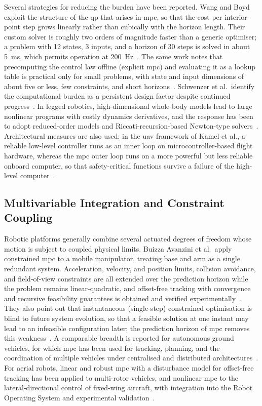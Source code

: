 Several strategies for reducing the burden have been reported. Wang and Boyd exploit the structure of the \ac{qp} that arises in \ac{mpc}, so that the cost per interior-point step grows linearly rather than cubically with the horizon length. Their custom solver is roughly two orders of magnitude faster than a generic optimiser; a problem with 12 states, 3 inputs, and a horizon of 30 steps is solved in about 5~ms, which permits operation at 200~Hz~\cite{wang2010}. The same work notes that precomputing the control law offline (explicit \ac{mpc}) and evaluating it as a lookup table is practical only for small problems, with state and input dimensions of about five or less, few constraints, and short horizons~\cite{wang2010,schwenzer2021}. Schwenzer et al.\ identify the computational burden as a persistent design factor despite continued progress~\cite{schwenzer2021}. In legged robotics, high-dimensional whole-body models lead to large nonlinear programs with costly dynamics derivatives, and the response has been to adopt reduced-order models and Riccati-recursion-based Newton-type solvers~\cite{katayama2023}. Architectural measures are also used: in the \ac{uav} framework of Kamel et al., a reliable low-level controller runs as an inner loop on microcontroller-based flight hardware, whereas the \ac{mpc} outer loop runs on a more powerful but less reliable onboard computer, so that safety-critical functions survive a failure of the high-level computer~\cite{kamel2017}.

\subsection{Multivariable Integration and Constraint Coupling}\label{sec:bg-apps-multivariable}

Robotic platforms generally combine several actuated degrees of freedom whose motion is subject to coupled physical limits. Buizza Avanzini et al.\ apply constrained \ac{mpc} to a mobile manipulator, treating base and arm as a single redundant system. Acceleration, velocity, and position limits, collision avoidance, and field-of-view constraints are all extended over the prediction horizon while the problem remains linear-quadratic, and offset-free tracking with convergence and recursive feasibility guarantees is obtained and verified experimentally~\cite{buizza2018}. They also point out that instantaneous (single-step) constrained optimisation is blind to future system evolution, so that a feasible solution at one instant may lead to an infeasible configuration later; the prediction horizon of \ac{mpc} removes this weakness~\cite{buizza2018}. A comparable breadth is reported for autonomous ground vehicles, for which \ac{mpc} has been used for tracking, planning, and the coordination of multiple vehicles under centralised and distributed architectures~\cite{yu2021}. For aerial robots, linear and robust \ac{mpc} with a disturbance model for offset-free tracking has been applied to multi-rotor vehicles, and nonlinear \ac{mpc} to the lateral-directional control of fixed-wing aircraft, with integration into the Robot Operating System and experimental validation~\cite{kamel2017}.

